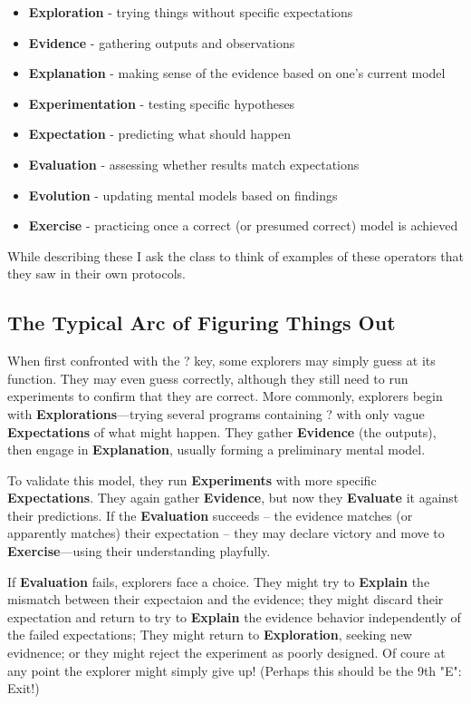 \documentclass[12pt,letterpaper]{article}
\begin{document}
\begin{itemize}
\item \textbf{Exploration} - trying things without specific expectations
\item \textbf{Evidence} - gathering outputs and observations
\item \textbf{Explanation} - making sense of the evidence based on one's current model
\item \textbf{Experimentation} - testing specific hypotheses
\item \textbf{Expectation} - predicting what should happen
\item \textbf{Evaluation} - assessing whether results match expectations
\item \textbf{Evolution} - updating mental models based on findings
\item \textbf{Exercise} - practicing once a correct (or presumed correct) model is achieved

\end{itemize}

While describing these I ask the class to think of examples of these operators that they saw in their own protocols. 

\subsection{The Typical Arc of Figuring Things Out}

When first confronted with the ? key, some explorers may simply guess at its function. They may even guess correctly, although they still need to run experiments to confirm that they are correct. More commonly, explorers begin with \textbf{Explorations}—trying several programs containing ? with only vague \textbf{Expectations} of what might happen. They gather \textbf{Evidence} (the outputs), then engage in \textbf{Explanation}, usually forming a preliminary mental model.

To validate this model, they run \textbf{Experiments} with more specific \textbf{Expectations}. They again gather \textbf{Evidence}, but now they \textbf{Evaluate} it against their predictions. If the \textbf{Evaluation} succeeds -- the evidence matches (or apparently matches) their expectation -- they may declare victory and move to \textbf{Exercise}—using their understanding playfully.

If \textbf{Evaluation} fails, explorers face a choice. They might try to \textbf{Explain} the mismatch between their expectaion and the evidence; they might discard their expectation and return to try to \textbf{Explain} the evidence behavior independently of the failed expectations; They might return to \textbf{Exploration}, seeking new evidnence; or they might reject the experiment as poorly designed. Of coure at any point the explorer might simply give up! (Perhaps this should be the 9th "E": Exit!)
\end{document}
